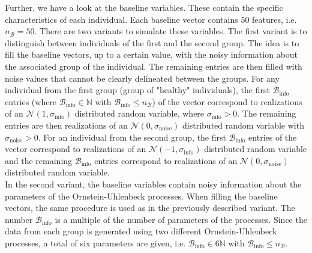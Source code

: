 \documentclass[11pt,titlepage]{article}
\newcommand{\N}{\mathbb{N}} %
\theoremstyle{definition}
\theoremstyle{remark}
\begin{document}
	Further, we have a look at the baseline variables. These contain the specific characteristics of each individual. Each baseline vector contains $50$ features, i.e. $n_\mathcal{B}=50$. There are two variants to simulate these variables. The first variant is to distinguish between individuals of the first and the second group. The idea is to fill the baseline vectors, up to a certain value, with the noisy information about the associated group of the individual. The remaining entries are then filled with noise values that cannot be clearly delineated between the groups. For any individual from the first group (group of "healthy" individuals), the first $\mathcal{B}_\mathrm{info}$ entries (where $\mathcal{B}_\mathrm{info}\in\N$ with $\mathcal{B}_\mathrm{info}\leq n_\mathcal{B}$) of the vector correspond to realizations of an $\mathcal{N}(1,\sigma_\mathrm{info})$ distributed random variable, where $\sigma_\mathrm{info}>0$. The remaining entries are then realizations of an $\mathcal{N}(0,\sigma_\mathrm{noise})$ distributed random variable with $\sigma_{\mathrm{noise}}>0$. For an individual from the second group, the first $\mathcal{B}_\mathrm{info}$ entries of the vector correspond to realizations of an $\mathcal{N}(-1,\sigma_\mathrm{info})$ distributed random variable and the remaining $\mathcal{B}_\mathrm{info}$ entries correspond to realizations of an $\mathcal{N}(0,\sigma_\mathrm{noise})$ distributed random variable. \\
	In the second variant, the baseline variables contain noisy information about the parameters of the Ornstein-Uhlenbeck processes. When filling the baseline vectors, the same procedure is used as in the previously described variant. The number $\mathcal{B}_\mathrm{info}$ is a multiple of the number of parameters of the processes. Since the data from each group is generated using two different Ornstein-Uhlenbeck processes, a total of six parameters are given, i.e. $\mathcal{B}_\mathrm{info}\in 6\N$ with $\mathcal{B}_\mathrm{info}\leq n_\mathcal{B}$. \\
\end{document}
